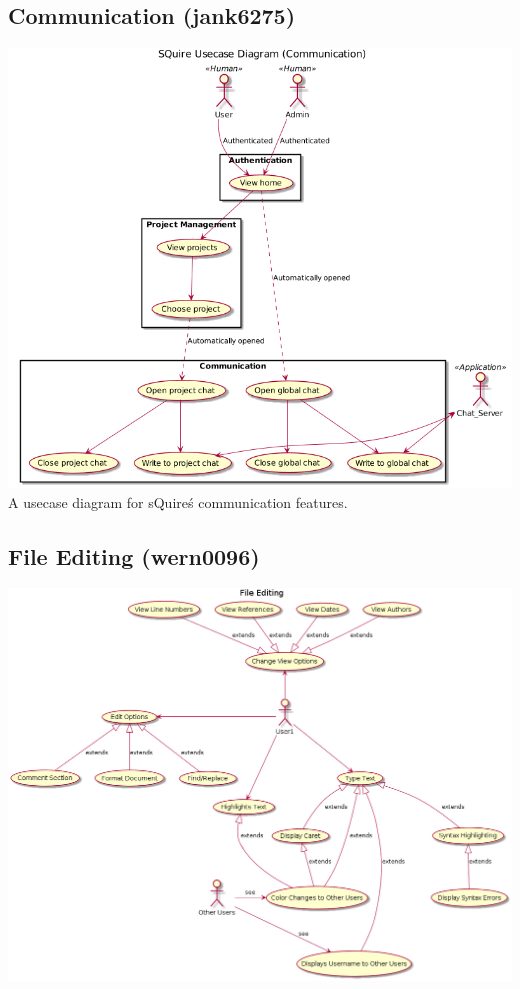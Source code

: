 \documentclass[11pt]{report}
\begin{document}
\subsection{Communication (jank6275)}
\includegraphics[width=\textwidth]{diagrams/jank6275}
A usecase diagram for sQuire\'s communication features.

\subsection{File Editing (wern0096)}
\includegraphics[width=\textwidth]{diagrams/wern0096-FileEditing}
\end{document}
